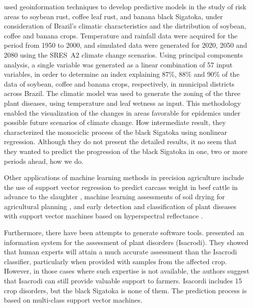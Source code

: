 \citet{Alves2011} used geoinformation techniques to
develop predictive models in the study of risk areas to soybean rust,
coffee leaf rust, and banana black Sigatoka, under consideration of
Brazil’s climatic characteristics and the distribution of soybean,
coffee and banana crops.
%
Temperature and rainfall data were acquired for the period from 1950
to 2000, and simulated data were generated for 2020, 2050 and 2080
using the SRES~A2 climate change scenarios.
%
Using principal components analysis, a single variable was generated
as a linear combination of 57 input variables, in order to determine
an index explaining 87\%, 88\% and 90\% of the data
%
%
of soybean, coffee and
banana crops, respectively, in municipal districts across Brazil.
%
The climatic model was used to generate the zoning of the three plant
diseases, using temperature and leaf wetness as input.
%
%
This methodology enabled the visualization of the changes in areas
favorable for epidemics under possible future scenarios of climate
change.
%
How intermediate result, they characterized the monociclic process of the black Sigatoka using  nonlinear regression. Although they do not present the detailed results, it no seem that they wanted to predict the progression of the black Sigatoka in one, two or more periods ahead, how we do.

Other applications of machine learning methods in precision
agriculture include the use of support vector regression to predict
carcass weight in beef cattle in advance to the slaughter
\citep{Alonso2013}, machine learning assessments of soil drying for
agricultural planning \citep{Coopersmith2014}, and early detection and
classification of plant diseases with support vector machines based on
hyperspectral reflectance \citep{Rumpf2010}.

Furthermore, there have been attempts to generate software
tools. \citet{Camargo2012} presented an information
system for the assessment of plant disorders (Isacrodi).
%
They showed that human experts will attain a much accurate assessment
than the Isacrodi classifier, particularly when provided with samples
from the affected crop. However, in those cases where such expertise
is not available, the authors suggest that Isacrodi can still provide
valuable support to farmers.
%
Isacordi includes 15 crop disorders, but the black Sigatoka is none
of them. The prediction process is based on multi-class support vector
machines.

